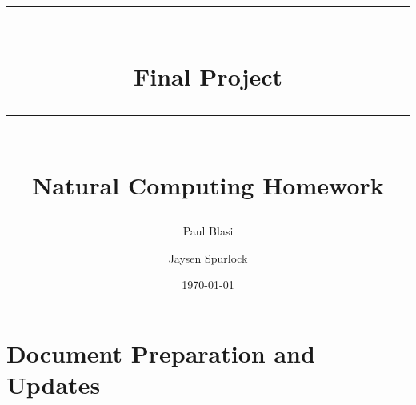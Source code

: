 \documentclass[table]{book}
\title{{\rule{\linewidth}{0.5mm}}\\[2mm]{\huge\bfseries Final Project}\\[-1mm]{\rule{\linewidth}{0.5mm}} \\  \vfill
{\LARGE \bfseries Natural Computing Homework}\vfill}
\author{Paul Blasi \and Jaysen Spurlock}
\date{\today}
\begin{document}
\frontmatter

\maketitle
\tableofcontents
{}

\chapter{Document Preparation and Updates}


\mainmatter









\appendix


\end{document}
